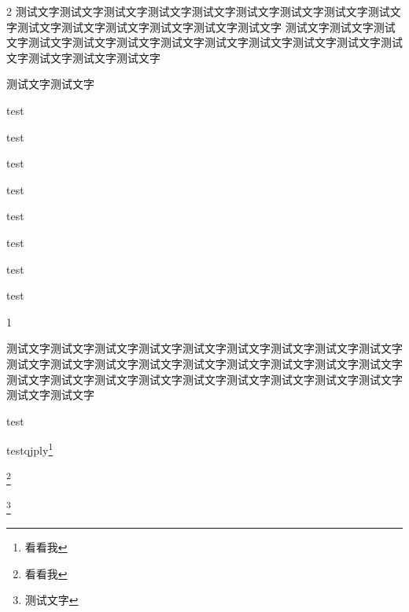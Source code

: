 \begin{Project}
\clearpage

\lipsum[1]




\begin{multicols}{2}
测试文字测试文字测试文字测试文字测试文字测试文字测试文字测试文字测试文字测试文字测试文字测试文字测试文字测试文字测试文字
测试文字测试文字测试文字测试文字测试文字测试文字测试文字测试文字测试文字测试文字测试文字测试文字测试文字测试文字测试文字
\end{multicols}

\clearpage


\Listening

\Reading

\Writing

\Speaking


\lipsum[1][1-5]


\begin{UnnumberedItem}[3]

\item 测试文字测试文字
\item test
\item test
\item test
\item test
\item test
\item test
\item test
\item test
\end{UnnumberedItem}

\begin{NumberedItem}{1}
	\item 测试文字测试文字测试文字测试文字测试文字测试文字测试文字测试文字测试文字测试文字测试文字测试文字测试文字测试文字测试文字测试文字测试文字测试文字测试文字测试文字测试文字测试文字测试文字测试文字测试文字测试文字测试文字测试文字测试文字
	\item test
	\item testqjply\footnote{看看我}
\end{NumberedItem}



\begin{Proof}
	\lipsum[1]\footnote{看看我}
	\tcblower
	\lipsum[1]
	\lipsum[2]
\end{Proof}

\begin{Block}%
	\lipsum[1]
	\tcblower
	\footnote{测试文字}\lipsum
\end{Block}



\end{Project}
